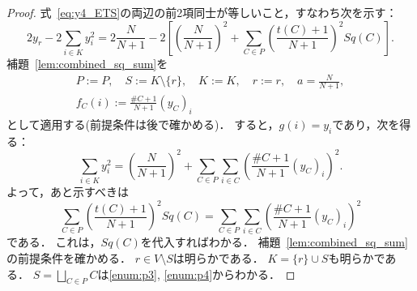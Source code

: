 \begin{proof}
  式~\eqref{eq:y4_ETS}の両辺の前2項同士が等しいこと，すなわち次を示す：
  \begin{equation}
    2 y_r - 2 \sum_{i \in K} y_i ^ 2
    = 2 \frac{N}{N + 1} - 2 \left[ \left( \frac{N}{N + 1} \right) ^ 2 + \sum_{C \in P} \left( \frac{t(C) + 1}{N + 1} \right) ^ 2 Sq(C) \right].
  \end{equation}
  補題~\ref{lem:combined_sq_sum}を
  \begin{gather}
    P := P,\quad S := K \setminus \{r\},\quad K := K,\quad r := r,\quad a = \frac{N}{N + 1}, \\
    f_C(i) := \frac{\# C + 1}{N + 1} (y_C)_i
  \end{gather}
  として適用する(前提条件は後で確かめる)．
  すると，$g(i) = y_i$であり，次を得る：
  \begin{equation}
    \sum_{i \in K} y_i ^ 2
    = \left( \frac{N}{N + 1} \right) ^ 2 + \sum_{C \in P} \sum_{i \in C} \left( \frac{\# C + 1}{N + 1} (y_C)_i \right) ^ 2.
  \end{equation}
  よって，あと示すべきは
  \begin{equation}
    \sum_{C \in P} \left( \frac{t(C) + 1}{N + 1} \right) ^ 2 Sq(C)
    = \sum_{C \in P} \sum_{i \in C} \left( \frac{\# C + 1}{N + 1} (y_C)_i \right) ^ 2
  \end{equation}
  である．
  これは，$Sq(C)$を代入すればわかる．
  補題~\ref{lem:combined_sq_sum}の前提条件を確かめる．
  $r \in V \setminus S$は明らかである．
  $K = \{r\} \cup S$も明らかである．
  $S = \displaystyle \bigsqcup_{C \in P} C$は\ref{enum:p3}, \ref{enum:p4}からわかる．


\end{proof}
